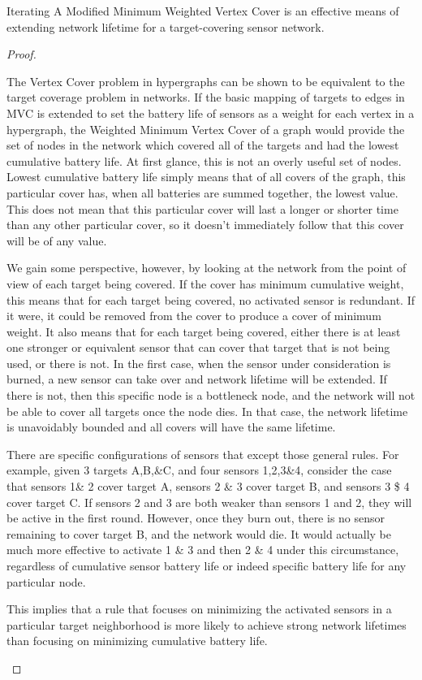 


\begin{thm}
Iterating A Modified Minimum Weighted Vertex Cover is an effective means of extending network lifetime for a target-covering sensor network.
\end{thm}

\begin{proof}
\begin{smy}
The Vertex Cover problem in hypergraphs can be shown to be equivalent to the target coverage problem in networks. If the basic mapping of targets to edges in MVC is extended to set the battery life of sensors as a weight for each vertex in a hypergraph, the Weighted Minimum Vertex Cover of a graph would provide the set of nodes in the network which covered all of the targets and had the lowest cumulative battery life. At first glance, this is not an overly useful set of nodes. Lowest cumulative battery life simply means that of all covers of the graph, this particular cover has, when all batteries are summed together, the lowest value. This does not mean that this particular cover will last a longer or shorter time than any other particular cover, so it doesn't immediately follow that this cover will be of any value.

We gain some perspective, however, by looking at the network from the point of view of each target being covered. If the cover has minimum cumulative weight, this means that for each target being covered, no activated sensor is redundant. If it were, it could be removed from the cover to produce a cover of minimum weight. It also means that for each target being covered, either there is at least one stronger or equivalent sensor that can cover that target that is not being used, or there is not. In the first case, when the sensor under consideration is burned, a new sensor can take over and network lifetime will be extended. If there is not, then this specific node is a bottleneck node, and the network will not be able to cover all targets once the node dies. In that case, the network lifetime is unavoidably bounded and all covers will have the same lifetime.

There are specific configurations of sensors that except those general rules. For example, given 3 targets A,B,\&C, and four sensors 1,2,3\&4, consider the case that sensors 1\& 2 cover target A, sensors 2 \& 3 cover target B, and sensors 3 \$ 4 cover target C. If sensors 2 and 3 are both weaker than sensors 1 and 2, they will be active in the first round. However, once they burn out, there is no sensor remaining to cover target B, and the network would die. It would actually be much more effective to activate 1 \& 3 and then 2 \& 4 under this circumstance, regardless of cumulative sensor battery life or indeed specific battery life for any particular node.

This implies that a rule that focuses on minimizing the activated sensors in a particular target neighborhood is more likely to achieve strong network lifetimes than focusing on minimizing cumulative battery life. 
\end{smy}
\end{proof}
